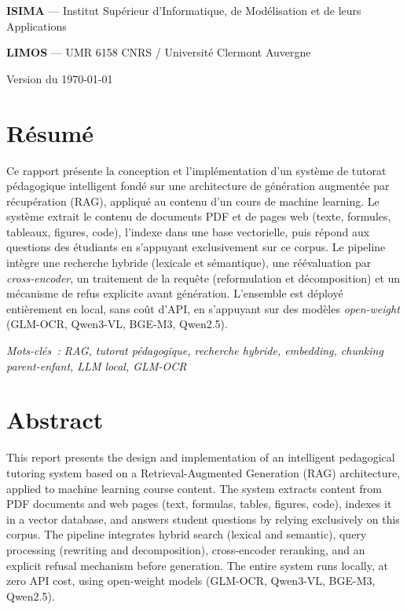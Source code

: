 \documentclass[11pt,a4paper]{article}
\begin{document}
\begin{titlepage}
\vfill

\vspace{1cm}

{\color{bleuPrincipal}\textbf{ISIMA} --- Institut Supérieur d'Informatique, de Modélisation et de leurs Applications\par}
{\color{bleuSecondaire}\textbf{LIMOS} --- UMR 6158 CNRS / Université Clermont Auvergne\par}

{\footnotesize\color{grisTexte}
Version du \today
}

\end{titlepage}

\section*{Résumé}

Ce rapport présente la conception et l'implémentation d'un système de tutorat pédagogique intelligent fondé sur une architecture de génération augmentée par récupération (RAG), appliqué au contenu d'un cours de machine learning. Le système extrait le contenu de documents PDF et de pages web (texte, formules, tableaux, figures, code), l'indexe dans une base vectorielle, puis répond aux questions des étudiants en s'appuyant exclusivement sur ce corpus. Le pipeline intègre une recherche hybride (lexicale et sémantique), une réévaluation par \textit{cross-encoder}, un traitement de la requête (reformulation et décomposition) et un mécanisme de refus explicite avant génération. L'ensemble est déployé entièrement en local, sans coût d'API, en s'appuyant sur des modèles \textit{open-weight} (GLM-OCR, Qwen3-VL, BGE-M3, Qwen2.5).

\textit{Mots-clés~: RAG, tutorat pédagogique, recherche hybride, \textit{embedding}, \textit{chunking} parent-enfant, LLM local, GLM-OCR}

\section*{Abstract}

This report presents the design and implementation of an intelligent pedagogical tutoring system based on a Retrieval-Augmented Generation (RAG) architecture, applied to machine learning course content. The system extracts content from PDF documents and web pages (text, formulas, tables, figures, code), indexes it in a vector database, and answers student questions by relying exclusively on this corpus. The pipeline integrates hybrid search (lexical and semantic), query processing (rewriting and decomposition), cross-encoder reranking, and an explicit refusal mechanism before generation. The entire system runs locally, at zero API cost, using open-weight models (GLM-OCR, Qwen3-VL, BGE-M3, Qwen2.5).
\end{document}
